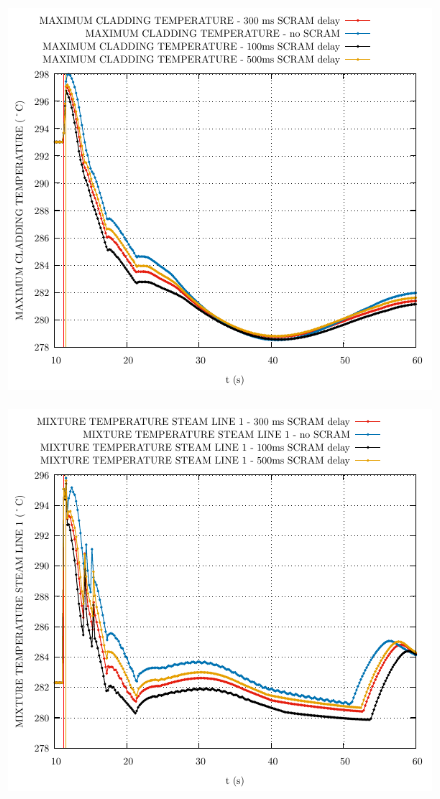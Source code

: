 \documentclass{article}
\begin{document}
\begin{multicols}{2}
\begin{figure}[H]
\end{figure}
\begin{figure}[H]
\centering
\includegraphics[width=\columnwidth]{./graphs/MAXIMUM CLADDING TEMPERATURE_comp.pdf}
\end{figure}
\begin{figure}[H]
\centering
\includegraphics[width=\columnwidth]{./graphs/MIXTURE TEMPERATURE STEAM LINE 1_comp.pdf}

\end{figure}
\end{multicols}
\end{document}
